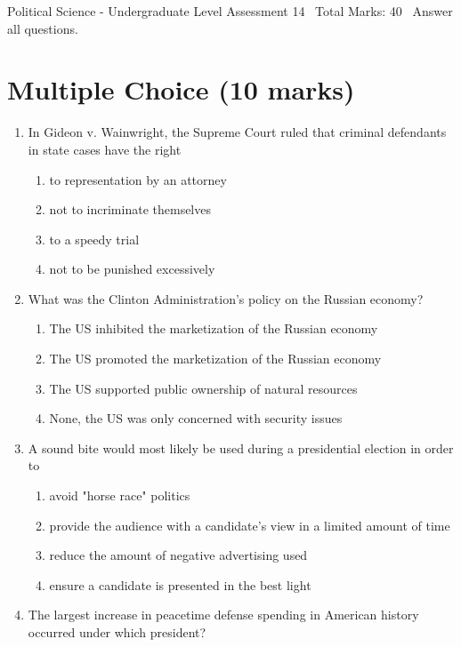 \documentclass[12pt]{article}
\begin{document}
\begin{center}
Political Science - Undergraduate Level Assessment 14 \
Total Marks: 40 \
Answer all questions.
\end{center}

\section*{Multiple Choice (10 marks)}
\begin{enumerate}[label=\arabic*.]
\item In Gideon v. Wainwright, the Supreme Court ruled that criminal defendants in state cases have the right
\begin{enumerate}[label=(\alph*)]
    \item to representation by an attorney
    \item not to incriminate themselves
    \item to a speedy trial
    \item not to be punished excessively
\end{enumerate}
\item What was the Clinton Administration's policy on the Russian economy?
\begin{enumerate}[label=(\alph*)]
    \item The US inhibited the marketization of the Russian economy
    \item The US promoted the marketization of the Russian economy
    \item The US supported public ownership of natural resources
    \item None, the US was only concerned with security issues
\end{enumerate}
\item A sound bite would most likely be used during a presidential election in order to
\begin{enumerate}[label=(\alph*)]
    \item avoid "horse race" politics
    \item provide the audience with a candidate's view in a limited amount of time
    \item reduce the amount of negative advertising used
    \item ensure a candidate is presented in the best light
\end{enumerate}
\item The largest increase in peacetime defense spending in American history occurred under which president?
\begin{enumerate}[label=(\alph*)]

\end{enumerate}
\end{enumerate}
\end{document}
